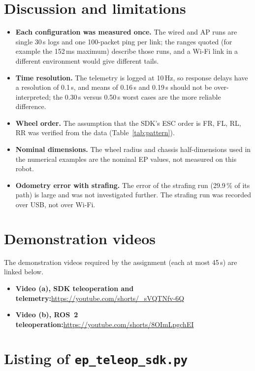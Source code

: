 \documentclass[11pt,a4paper]{article}
\newcommand{\videolinkone}{\url{https://youtube.com/shorts/_sVQTNfv-6Q}}
\newcommand{\videolinktwo}{\url{https://youtube.com/shorts/8OImLpgchEI}}
\begin{document}
\section{Discussion and limitations}
\begin{itemize}
  \item \textbf{Each configuration was measured once.} The wired and AP runs are single 30\,s logs and one 100-packet ping per link; the ranges quoted (for example the 152\,ms maximum) describe those runs, and a Wi-Fi link in a different environment would give different tails.
  \item \textbf{Time resolution.} The telemetry is logged at 10\,Hz, so response delays have a resolution of 0.1\,s, and means of 0.16\,s and 0.19\,s should not be over-interpreted; the 0.30\,s versus 0.50\,s worst cases are the more reliable difference.
  \item \textbf{Wheel order.} The assumption that the SDK's ESC order is FR, FL, RL, RR was verified from the data (Table~\ref{tab:pattern}).
  \item \textbf{Nominal dimensions.} The wheel radius and chassis half-dimensions used in the numerical examples are the nominal EP values, not measured on this robot.
  \item \textbf{Odometry error with strafing.} The error of the strafing run (29.9\,\% of its path) is large and was not investigated further. The strafing run was recorded over USB, not over Wi-Fi.
\end{itemize}

\section{Demonstration videos}\label{sec:videos}
The demonstration videos required by the assignment (each at most 45\,s) are linked below.
\begin{itemize}
  \item \textbf{Video (a), SDK teleoperation and telemetry:}\newline \videolinkone{}
  \item \textbf{Video (b), ROS~2 teleoperation:}\newline \videolinktwo{}
\end{itemize}

\appendix
\section{Listing of \texttt{ep\_teleop\_sdk.py}}
{}
\end{document}
